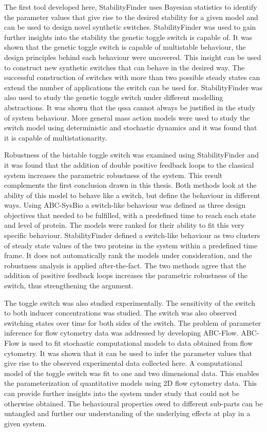 The first tool developed here, StabilityFinder uses Bayesian statistics to identify the parameter values that give rise to the desired stability for a given model and can be used to design novel synthetic switches. StabilityFinder was used to gain further insights into the stability the genetic toggle switch is capable of. It was shown that the genetic toggle switch is capable of multistable behaviour, the design principles behind each behaviour were uncovered. This insight can be used to construct new synthetic switches that can behave in the desired way. The successful construction of switches with more than two possible steady states can extend the number of applications the switch can be used for. StabilityFinder was also used to study the genetic toggle switch under different modelling abstractions. It was shown that the \acrshort{qssa} cannot always be justified in the study of system behaviour. More general mass action models were used to study the switch model using deterministic and stochastic dynamics and it was found that it is capable of multistationarity. 

Robustness of the bistable toggle switch was examined using StabilityFinder and it was found that the addition of double positive feedback loops to the classical system increases the parametric robustness of the system. This result complements the first conclusion drawn in this thesis. Both methods look at the ability of this model to behave like a switch, but define the behaviour in different ways. Using ABC-SysBio a switch-like behaviour was defined as three design objectives that needed to be fulfilled, with a predefined time to reach each state and level of protein. The models were ranked for their ability to fit this very specific behaviour. StabilityFinder defined a switch-like behaviour as two clusters of steady state values of the two proteins in the system within a predefined time frame. It does not automatically rank the models under consideration, and the robustness analysis is applied after-the-fact. The two methods agree that the addition of positive feedback loops increases the parametric robustness of the switch, thus strengthening the argument.  

The toggle switch was also studied experimentally. The sensitivity of the switch to both inducer concentrations was studied. The switch was also observed switching states over time for both sides of the switch. The problem of parameter inference for flow cytometry data was addressed by developing ABC-Flow.  ABC-Flow is used to fit stochastic computational models to data obtained from flow cytometry. It was shown that it can be used to infer the parameter values that give rise to the observed experimental data collected here. A computational model of the toggle switch was fit to one and two dimensional data. This enables the parameterization of quantitative models using 2D flow cytometry data. This can provide further insights into the system under study that could not be otherwise obtained. The behavioural properties owed to different sub-parts can be untangled and further our understanding of the underlying effects at play in a given system.

